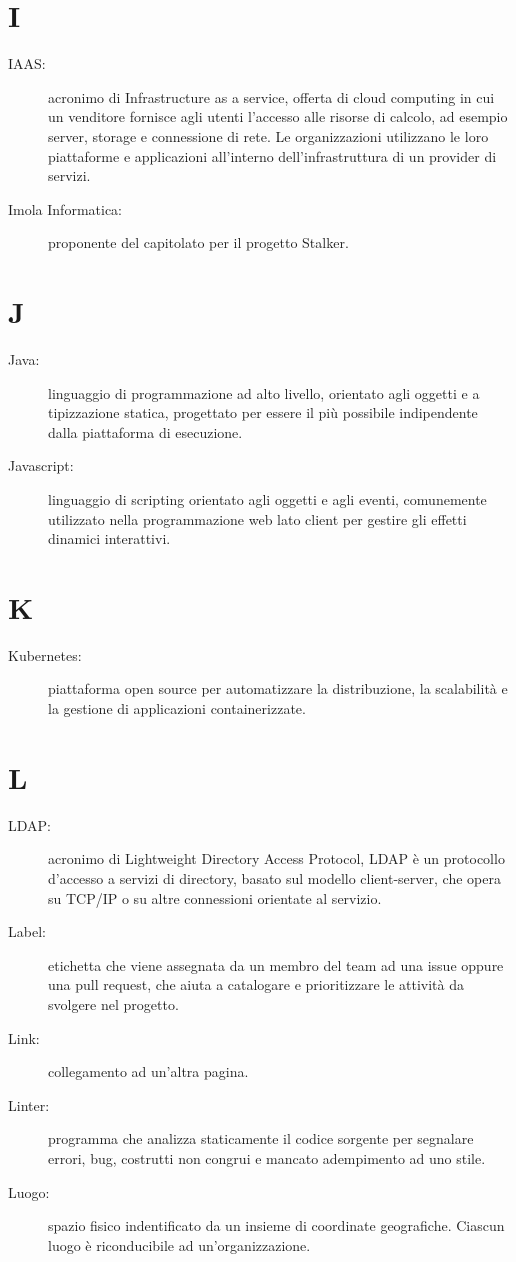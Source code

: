 \documentclass{article}
\begin{document}
	\section{I}
	\begin{description}
		\item[IAAS:] acronimo di Infrastructure as a service, offerta di cloud computing in cui un venditore fornisce agli utenti l'accesso alle risorse di calcolo, ad esempio server, storage e connessione di rete. Le organizzazioni utilizzano le loro piattaforme e applicazioni all'interno dell'infrastruttura di un provider di servizi.
		\item[Imola Informatica:] proponente del capitolato per il progetto Stalker.
	\end{description}
	\newpage
	\section{J}
	\begin{description}
		\item[Java:] linguaggio di programmazione ad alto livello, orientato agli oggetti e a tipizzazione statica, progettato per essere il più possibile indipendente dalla piattaforma di esecuzione.
		\item[Javascript:] linguaggio di scripting orientato agli oggetti e agli eventi, comunemente utilizzato nella programmazione web lato client per gestire gli effetti dinamici interattivi.
	\end{description}
	\newpage
	\section{K}
	\begin{description}
		\item[Kubernetes:] piattaforma open source per automatizzare la distribuzione, la scalabilità e la gestione di applicazioni containerizzate.
	\end{description}
	\newpage
	\section{L}
	\begin{description}
		\item[LDAP:] acronimo di Lightweight Directory Access Protocol, LDAP è un protocollo d'accesso a servizi di directory, basato sul modello client-server, che opera su TCP/IP o su altre connessioni orientate al servizio.
		\item[Label:] etichetta che viene assegnata da un membro del team ad una issue oppure una pull request, che aiuta a catalogare e prioritizzare le attività da svolgere nel progetto.
		\item[Link:] collegamento ad un'altra pagina.
		\item[Linter:] programma che analizza staticamente il codice sorgente per segnalare errori, bug, costrutti non congrui e mancato adempimento ad uno stile.
		\item[Luogo:] spazio fisico indentificato da un insieme di coordinate geografiche. Ciascun luogo è riconducibile ad un'organizzazione.
	\end{description}
	\newpage
\end{document}
